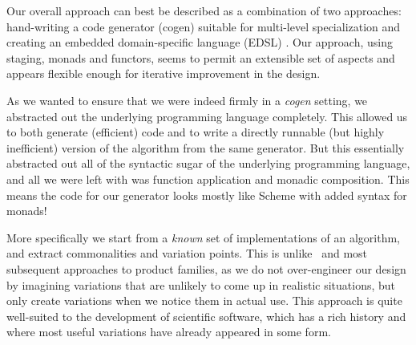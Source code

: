 \documentclass{elsart}
\newcommand{\oleg}[1]{{\it [Oleg says: #1]}}
\newcommand{\jacques}[1]{{\it [Jacques says: #1]}}
\begin{document}
Our overall approach can best be described as a combination 
of two approaches: hand-writing a code generator (cogen) suitable
for multi-level specialization \cite{Gluck95,GluckJ97} and creating
an embedded domain-specific language (EDSL) \cite{edsl,WhenHowDSL}.
Our approach, using staging, monads and functors, seems to permit 
an extensible set of aspects and appears flexible enough for iterative
improvement in the design.

%

As we wanted to ensure that we were indeed firmly in a \emph{cogen} setting,
we abstracted out the underlying programming language completely.  This 
allowed us to both generate (efficient) code and to write a directly
runnable (but highly inefficient) version of the algorithm from the same
generator.  But this
essentially abstracted out all of the syntactic sugar of the underlying
programming language, and all we were left with was function application
and monadic composition.  This means the code for our generator looks mostly
like Scheme with added syntax for monads!

More specifically we start from a \emph{known} set of implementations
of an algorithm, and extract commonalities and variation points.
This is unlike~\cite{journals/tse/Parnas76} and most subsequent
approaches to product families, as we do not over-engineer our design
by imagining variations that are unlikely to come up in realistic
situations, but only create variations when we notice them in actual use.
This approach is quite well-suited to the development of scientific
software, which has a rich history and where most useful variations have
already appeared in some form.
\end{document}

